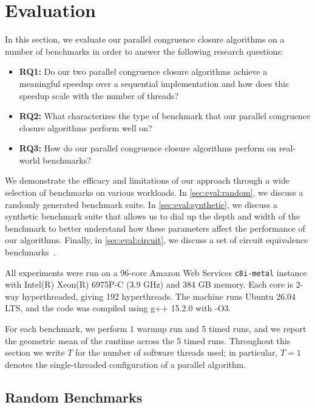 \section{Evaluation}
\label{sec:eval}

In this section, we evaluate our parallel congruence closure algorithms on a
number of benchmarks in order to answer the following research questions:

\begin{itemize}
  \item \textbf{RQ1:} Do our two parallel congruence closure algorithms achieve
  a meaningful speedup over a sequential implementation and how does this
  speedup scale with the number of threads?
  \item \textbf{RQ2:} What characterizes the type of benchmark that our parallel
  congruence closure algorithms perform well on?
  \item \textbf{RQ3:} How do our parallel congruence closure algorithms perform
  on real-world benchmarks?
\end{itemize}

We demonstrate the efficacy and limitations of our approach through a wide
selection of benchmarks on various workloads. In \autoref{sec:eval:random}, we
discuss a randomly generated benchmark suite. In \autoref{sec:eval:synthetic},
we discuss a synthetic benchmark suite that allows us to dial up the depth and
width of the benchmark to better understand how these parameters affect the
performance of our algorithms. Finally, in \autoref{sec:eval:circuit}, we
discuss a set of circuit equivalence benchmarks~\cite{clausal-cc}.

All experiments were run on a 96-core Amazon Web Services \texttt{c8i-metal}
instance with Intel(R) Xeon(R) 6975P-C (3.9 GHz) and 384 GB memory. Each core
is 2-way hyperthreaded, giving 192 hyperthreads. The machine runs Ubuntu
26.04 LTS, and the code was compiled using g++ 15.2.0 with -O3.

For each benchmark, we perform 1 warmup run and 5 timed runs, and we report the
geometric mean of the runtime across the 5 timed runs. Throughout this section
we write $T$ for the number of software threads used; in particular, $T{=}1$
denotes the single-threaded configuration of a parallel algorithm.


\subsection{Random Benchmarks}~\label{sec:eval:random}


